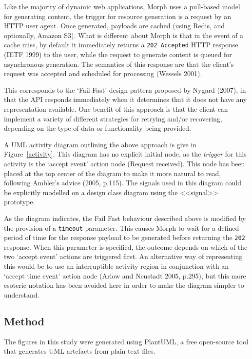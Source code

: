 \documentclass[a4paper]{article}
\begin{document}
Like the majority of dynamic web applications, Morph uses a pull-based model for generating content, the trigger for resource generation is a request by an HTTP user agent. Once generated, payloads are cached (using Redis, and optionally, Amazon S3). What is different about Morph is that in the event of a cache miss, by default it immediately returns a \texttt{202 Accepted} HTTP response (IETF 1999) to the user, while the request to generate content is queued for asynchronous generation. The semantics of this response are that the client's request was accepted and scheduled for processing (Wessels 2001).

This corresponds to the `Fail Fast' design pattern proposed by Nygard (2007), in that the API responds immediately when it determines that it does not have any representation available. One benefit of this approach is that the client can implement a variety of different strategies for retrying and/or recovering, depending on the type of data or functionality being provided.

A UML activity diagram outlining the above approach is give in Figure~\ref{activity}. This diagram has no explicit initial node, as the \textit{trigger} for this activity is the `accept event' action node (\textsf{Request received}). This node has been placed at the top center of the diagram to make it more natural to read, following Ambler's advice (2005, p.115). The signals used in this diagram could be explicitly modelled on a design class diagram using the \textsf{<<signal>>} prototype.

As the diagram indicates, the Fail Fast behaviour described above is modified by the provision of a \texttt{timeout} parameter. This causes Morph to wait for a defined period of time for the response payload to be generated before returning the \texttt{202} response. When this parameter is specified, the outcome depends on which of the two `accept event' actions are triggered first. An alternative way of representing this would be to use an interruptible activity region in conjunction with an `accept time event' action node (Arlow and Neustadt 2005, p.295), but this more esoteric notation has been avoided here in order to make the diagram simpler to understand.

\subsection{Method}

The figures in this study were generated using PlantUML, a free open-source tool\cite{plantuml} that generates UML artefacts from plain text files.
\end{document}

